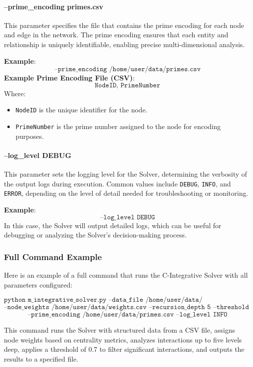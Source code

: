 \documentclass[%
 preprint, linenumbers,
 amsmath,amssymb,
 aps, physrev,
]{revtex4-2}
\begin{document}
\paragraph{--prime\_encoding primes.csv}
This parameter specifies the file that contains the prime encoding for each node and edge in the network. The prime encoding ensures that each entity and relationship is uniquely identifiable, enabling precise multi-dimensional analysis.

\textbf{Example}:
\[
\texttt{--prime\_encoding /home/user/data/primes.csv}
\]
\textbf{Example Prime Encoding File (CSV)}:
\[
\texttt{NodeID, PrimeNumber}
\]
Where:
\begin{itemize}
    \item \texttt{NodeID} is the unique identifier for the node.
    \item \texttt{PrimeNumber} is the prime number assigned to the node for encoding purposes.
\end{itemize}

\paragraph{--log\_level DEBUG}
This parameter sets the logging level for the Solver, determining the verbosity of the output logs during execution. Common values include \texttt{DEBUG}, \texttt{INFO}, and \texttt{ERROR}, depending on the level of detail needed for troubleshooting or monitoring.

\textbf{Example}:
\[
\texttt{--log\_level DEBUG}
\]
In this case, the Solver will output detailed logs, which can be useful for debugging or analyzing the Solver’s decision-making process.

\subsubsection{Full Command Example}

Here is an example of a full command that runs the C-Integrative Solver with all parameters configured:

\[
\texttt{python m\_integrative\_solver.py --data\_file /home/user/data/trafficking\_network.csv}
\]
\[
\texttt{--node\_weights /home/user/data/weights.csv --recursion\_depth 5 --threshold 0.7 --output\_file /home/user/results/analysis\_output.csv}
\]
\[
\texttt{--prime\_encoding /home/user/data/primes.csv --log\_level INFO}
\]

This command runs the Solver with structured data from a CSV file, assigns node weights based on centrality metrics, analyzes interactions up to five levels deep, applies a threshold of 0.7 to filter significant interactions, and outputs the results to a specified file.
\end{document}
